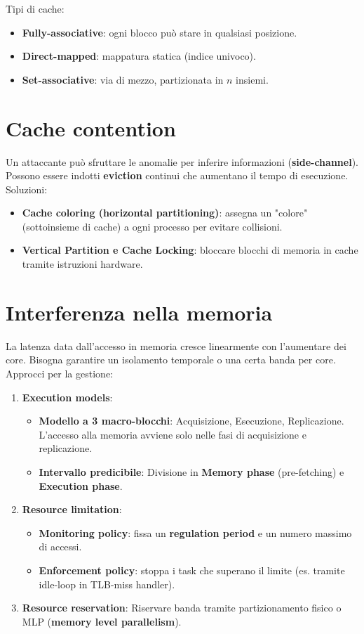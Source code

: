 \documentclass[11pt,a4paper]{report}
\begin{document}
Tipi di cache:
\begin{itemize}
    \item \textbf{Fully-associative}: ogni blocco può stare in qualsiasi posizione.
    \item \textbf{Direct-mapped}: mappatura statica (indice univoco).
    \item \textbf{Set-associative}: via di mezzo, partizionata in $n$ insiemi.
\end{itemize}

\section{Cache contention}

Un attaccante può sfruttare le anomalie per inferire informazioni (\textbf{side-channel}). Possono essere indotti \textbf{eviction} continui che aumentano il tempo di esecuzione.
Soluzioni:
\begin{itemize}
    \item \textbf{Cache coloring (horizontal partitioning)}: assegna un "colore" (sottoinsieme di cache) a ogni processo per evitare collisioni.
    \item \textbf{Vertical Partition e Cache Locking}: bloccare blocchi di memoria in cache tramite istruzioni hardware.
\end{itemize}

\section{Interferenza nella memoria}

La latenza data dall'accesso in memoria cresce linearmente con l'aumentare dei core. Bisogna garantire un isolamento temporale o una certa banda per core.
Approcci per la gestione:
\begin{enumerate}
    \item \textbf{Execution models}:
    \begin{itemize}
        \item \textbf{Modello a 3 macro-blocchi}: Acquisizione, Esecuzione, Replicazione. L'accesso alla memoria avviene solo nelle fasi di acquisizione e replicazione.
        \item \textbf{Intervallo predicibile}: Divisione in \textbf{Memory phase} (pre-fetching) e \textbf{Execution phase}.
    \end{itemize}
    \item \textbf{Resource limitation}:
    \begin{itemize}
        \item \textbf{Monitoring policy}: fissa un \textbf{regulation period} e un numero massimo di accessi.
        \item \textbf{Enforcement policy}: stoppa i task che superano il limite (es. tramite idle-loop in TLB-miss handler).
    \end{itemize}
    \item \textbf{Resource reservation}: Riservare banda tramite partizionamento fisico o MLP (\textbf{memory level parallelism}).
\end{enumerate}
\end{document}
